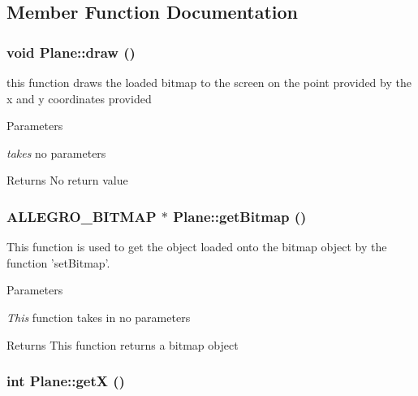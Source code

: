 \subsection{Member Function Documentation}
\hypertarget{classPlane_a8877358878e91929c4c01bad40cbdb78}{
\subsubsection[{draw}]{\setlength{\rightskip}{0pt plus 5cm}void Plane::draw ()}}
\label{classPlane_a8877358878e91929c4c01bad40cbdb78}


this function draws the loaded bitmap to the screen on the point provided by the x and y coordinates provided 
\begin{DoxyParams}{Parameters}
\item[{\em takes}]no parameters \end{DoxyParams}
\begin{DoxyReturn}{Returns}
No return value 
\end{DoxyReturn}
\hypertarget{classPlane_a0d2bb766e1d07c7097fd741adff8c4d8}{
\subsubsection[{getBitmap}]{\setlength{\rightskip}{0pt plus 5cm}ALLEGRO\_\-BITMAP $\ast$ Plane::getBitmap ()}}
\label{classPlane_a0d2bb766e1d07c7097fd741adff8c4d8}


This function is used to get the object loaded onto the bitmap object by the function 'setBitmap'. 
\begin{DoxyParams}{Parameters}
\item[{\em This}]function takes in no parameters \end{DoxyParams}
\begin{DoxyReturn}{Returns}
This function returns a bitmap object 
\end{DoxyReturn}
\hypertarget{classPlane_ab0db534796dff1c2ff490fe989261cda}{
\subsubsection[{getX}]{\setlength{\rightskip}{0pt plus 5cm}int Plane::getX ()}}
\label{classPlane_ab0db534796dff1c2ff490fe989261cda}


